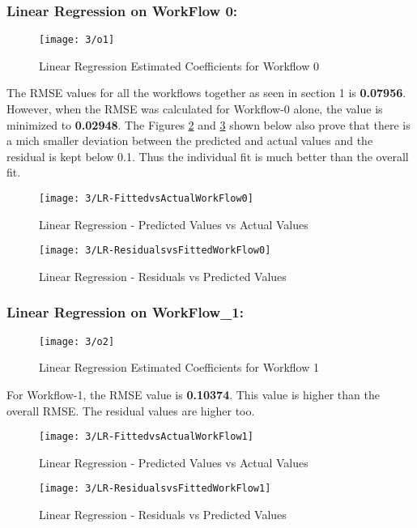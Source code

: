 \documentclass[letterpaper,twocolumn,10pt]{article}
\begin{document}
\subsubsection{Linear Regression on WorkFlow 0:}
\begin{figure}[H]
  \texttt{[image: 3/o1]}
  \caption{Linear Regression Estimated Coefficients for Workflow 0}
  \label{fig:o1}
\end{figure}
The RMSE values for all the workflows together as seen in section 1 is \textbf{0.07956}. However, when the RMSE was calculated for Workflow-0 alone, the value is minimized to \textbf{0.02948}. The Figures \ref{fig:WF0FittedActual} and \ref{fig:WF0ResidActual} shown below also prove that there is a mich smaller deviation between the predicted and actual values and the residual is kept below 0.1. Thus the individual fit is much better than the overall fit.
\begin{figure}[H]
  \texttt{[image: 3/LR-FittedvsActualWorkFlow0]}
  \caption{Linear Regression - Predicted Values vs Actual Values}
  \label{fig:WF0FittedActual}
\end{figure}
\begin{figure}[H]
  \texttt{[image: 3/LR-ResidualsvsFittedWorkFlow0]}
  \caption{Linear Regression - Residuals vs Predicted Values}
  \label{fig:WF0ResidActual}
\end{figure}

\subsubsection{Linear Regression on WorkFlow\_1:}
\begin{figure}[H]
  \texttt{[image: 3/o2]}
  \caption{Linear Regression Estimated Coefficients for Workflow 1}
  \label{fig:o2}
\end{figure}
For Workflow-1, the RMSE value is \textbf{0.10374}. This value is higher than the overall RMSE. The residual values are higher too.
\begin{figure}[H]
  \texttt{[image: 3/LR-FittedvsActualWorkFlow1]}
  \caption{Linear Regression - Predicted Values vs Actual Values}
  \label{fig:WF1FittedActual}
\end{figure}
\begin{figure}[H]
  \texttt{[image: 3/LR-ResidualsvsFittedWorkFlow1]}
  \caption{Linear Regression - Residuals vs Predicted Values}
  \label{fig:WF1ResidActual}
\end{figure}
\end{document}
